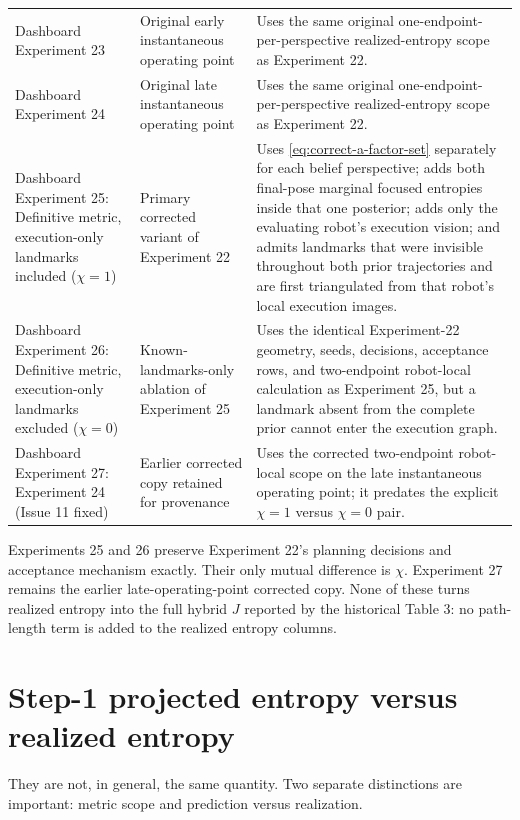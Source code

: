 \documentclass[11pt,a4paper]{article}
\begin{document}
\begin{longtable}{>{\raggedright\arraybackslash}p{}
                  >{\raggedright\arraybackslash}p{}
                  >{\raggedright\arraybackslash}p{}}
Dashboard Experiment 23 &
Original early instantaneous operating point &
Uses the same original one-endpoint-per-perspective realized-entropy scope as
Experiment 22. \\

Dashboard Experiment 24 &
Original late instantaneous operating point &
Uses the same original one-endpoint-per-perspective realized-entropy scope as
Experiment 22. \\

Dashboard Experiment 25:
Definitive metric, execution-only landmarks included ($\chi=1$) &
Primary corrected variant of Experiment 22 &
Uses \eqref{eq:correct-a-factor-set} separately for each belief perspective;
adds both final-pose marginal focused entropies inside that one posterior;
adds only the evaluating robot's execution vision; and admits landmarks that
were invisible throughout both prior trajectories and are first triangulated
from that robot's local execution images. \\

Dashboard Experiment 26:
Definitive metric, execution-only landmarks excluded ($\chi=0$) &
Known-landmarks-only ablation of Experiment 25 &
Uses the identical Experiment-22 geometry, seeds, decisions, acceptance rows,
and two-endpoint robot-local calculation as Experiment 25, but a landmark
absent from the complete prior cannot enter the execution graph. \\

Dashboard Experiment 27:
Experiment 24 (Issue 11 fixed) &
Earlier corrected copy retained for provenance &
Uses the corrected two-endpoint robot-local scope on the late instantaneous
operating point; it predates the explicit $\chi=1$ versus $\chi=0$ pair. \\
\end{longtable}

Experiments 25 and 26 preserve Experiment 22's planning decisions and
acceptance mechanism exactly.  Their only mutual difference is $\chi$.
Experiment 27 remains the earlier late-operating-point corrected copy.  None
of these turns realized entropy into the full hybrid $J$ reported by the
historical Table 3: no path-length term is added to the realized entropy
columns.

\section{Step-1 projected entropy versus realized entropy}

They are not, in general, the same quantity.  Two separate distinctions are
important: metric scope and prediction versus realization.
\end{document}
